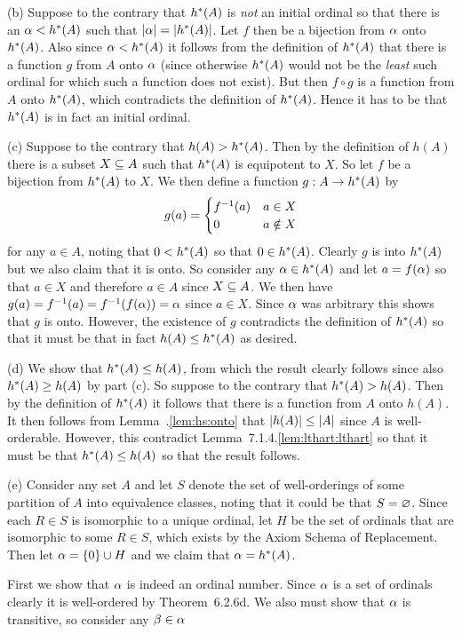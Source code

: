 \begin{solution}
    (b) Suppose to the contrary that $\hs(A)$ is \emph{not} an initial ordinal so that there is an $\a < \hs(A)$ such that $\abs{\a} = \abs{\hs(A)}$.
    Let $f$ then be a bijection from $\a$ onto $\hs(A)$.
    Also since $\a < \hs(A)$ it follows from the definition of $\hs(A)$ that there is a function $g$ from $A$ onto $\a$ (since otherwise $\hs(A)$ would not be the \emph{least} such ordinal for which such a function does not exist).
    But then $f \circ g$ is a function from $A$ onto $\hs(A)$, which contradicts the definition of $\hs(A)$.
    Hence it has to be that $\hs(A)$ is in fact an initial ordinal.

    (c) Suppose to the contrary that $h(A) > \hs(A)$.
    Then by the definition of $h(A)$ there is a subset $X \ss A$ such that $\hs(A)$ is equipotent to $X$.
    So let $f$ be a bijection from $\hs(A)$ to $X$.
    We then define a function $g : A \to \hs(A)$ by
    $$
    g(a) = \begin{cases}
         \inv{f}(a) & a \in X \\
         0 & a \notin X
    \end{cases}
    $$
    for any $a \in A$, noting that $0 < \hs(A)$ so that $0 \in \hs(A)$.
    Clearly $g$ is into $\hs(A)$ but we also claim that it is onto.
    So consider any $\a \in \hs(A)$ and let $a = f(\a)$ so that $a \in X$ and therefore $a \in A$ since $X \ss A$.
    We then have $g(a) = \inv{f}(a) = \inv{f}(f(\a)) = \a$ since $a \in X$.
    Since $\a$ was arbitrary this shows that $g$ is onto.
    However, the existence of $g$ contradicts the definition of $\hs(A)$ so that it must be that in fact $h(A) \leq \hs(A)$ as desired. \qedsymbol

    (d) We show that $\hs(A) \leq h(A)$, from which the result clearly follows since also $\hs(A) \geq h(A)$ by part (c).
    So suppose to the contrary that $\hs(A) > h(A)$.
    Then by the definition of $\hs(A)$ it follows that there is a function from $A$ onto $h(A)$.
    It then  follows from Lemma~\ex.\ref{lem:hs:onto} that $\abs{h(A)} \leq \abs{A}$ since $A$ is well-orderable.
    However, this contradict Lemma~7.1.4.\ref{lem:lthart:lthart} so that it must be that $\hs(A) \leq h(A)$ so that the result follows.

    (e) Consider any set $A$ and let $S$ denote the set of well-orderings of some partition of $A$ into equivalence classes, noting that it could be that $S = \es$.
    Since each $R \in S$ is isomorphic to a unique ordinal, let $H$ be the set of ordinals that are isomorphic to some $R \in S$, which exists by the Axiom Schema of Replacement.
    Then let $\a = \braces{0} \cup H$ and we claim that $\a = \hs(A)$.

    First we show that $\a$ is indeed an ordinal number.
    Since $\a$ is a set of ordinals clearly it is well-ordered by Theorem~6.2.6d.
    We also must show that $\a$ is transitive, so consider any $\b \in \a$ 
\end{solution}
